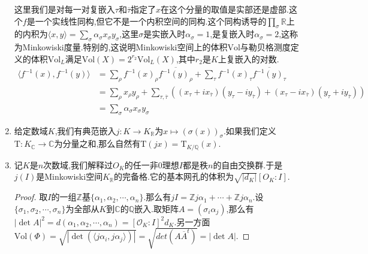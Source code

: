 \begin{enumerate}
    这里我们是对每一对复嵌入$\tau$和$\overline{\tau}$指定了$x$在这个分量的取值是实部还是虚部.这个$f$是一个实线性同构,但它不是一个内积空间的同构.这个同构诱导的$\prod_{\sigma}\mathbb{R}$上的内积为$\langle x,y\rangle=\sum_{\sigma}\alpha_{\sigma}x_{\sigma}y_{\sigma}$,这里$\sigma$是实嵌入时$\alpha_{\sigma}=1$,是复嵌入时$\alpha_{\sigma}=2$,这称为Minkowiski度量.特别的,这说明Minkowiski空间上的体积$\mathrm{Vol}$与勒贝格测度定义的体积$\mathrm{Vol}_L$满足$\mathrm{Vol}(X)=2^{r_2}\mathrm{Vol}_L(X)$,其中$r_2$是$K$上复嵌入的对数.
    \begin{align*}
        \langle f^{-1}(x),f^{-1}(y)\rangle&=\sum_{\rho}f^{-1}(x)_{\rho}\overline{f^{-1}(y)_{\rho}}+\sum_{\tau}f^{-1}(x)_{\tau}\overline{f^{-1}(y)_{\tau}}\\&=\sum_{\rho}x_{\rho}y_{\rho}+\sum_{\tau,\overline{\tau}}\left((x_{\tau}+ix_{\overline{\tau}})(y_{\tau}-iy_{\overline{\tau}})+(x_{\tau}-ix_{\overline{\tau}})(y_{\tau}+iy_{\overline{\tau}})\right)\\&=\sum_{\sigma}\alpha_{\sigma}x_{\sigma}y_{\sigma} 
    \end{align*}
    \item 给定数域$K$,我们有典范嵌入$j:K\to K_{\mathbb{R}}$为$x\mapsto(\sigma(x))_{\sigma}$.如果我们定义$\mathrm{T}:K_{\mathbb{C}}\to\mathbb{C}$为分量之和,那么自然有$\mathrm{T}(jx)=\mathrm{T}_{K/\mathbb{Q}}(x)$.
    \item 记$K$是$n$次数域,我们解释过$O_K$的任一非0理想$I$都是秩$n$的自由交换群.于是$j(I)$是Minkowiski空间$K_{\mathbb{R}}$的完备格.它的基本网孔的体积为$\sqrt{|d_K|}[O_K:I]$.
    \begin{proof}
    	
    	取$I$的一组$\mathbb{Z}$基$\{\alpha_1,\alpha_2,\cdots,\alpha_n\}$.那么有$jI=\mathbb{Z}j\alpha_1+\cdots+\mathbb{Z}j\alpha_n$.设$\{\sigma_1,\sigma_2,\cdots,\sigma_n\}$为全部从$K$到$\mathbb{C}$的$\mathbb{Q}$嵌入.取矩阵$A=(\sigma_i\alpha_j)$,那么有$|\det A|^2=d(\alpha_1,\alpha_2,\cdots,\alpha_n)=[\mathscr{O}_K:I]^2d_K$.另一方面$\mathrm{Vol}(\Phi)=\sqrt{|\det(\langle j\alpha_i,j\alpha_j\rangle)|}=\sqrt{det(A\overline{A}^t)}=|\det A|$.
    \end{proof}
\end{enumerate}

